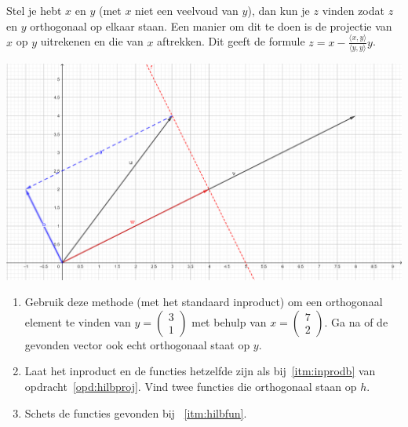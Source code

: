 \documentclass[../../main.tex]{subfiles}
\begin{document}
\begin{opdrachtlang}
Stel je hebt $x$ en $y$ (met $x$ niet een veelvoud van $y$), dan kun je $z$ vinden zodat $z$ en $y$ orthogonaal op elkaar staan. Een manier om dit te doen is de projectie van $x$ op $y$ uitrekenen en die van $x$ aftrekken. Dit geeft de formule $z=x-\frac{\langle x,y\rangle}{\langle y,y\rangle}y$.

\begin{minipage}{\textwidth}
    \includegraphics[width=.95\textwidth]{./img/projectie 2.png}
\end{minipage}
\vspace{.5cm}




\begin{enumerate}
    \item Gebruik deze methode (met het standaard inproduct) om een orthogonaal element te vinden van $y=\begin{pmatrix}3\\1\end{pmatrix}$ met behulp van $x=\begin{pmatrix}7\\2\end{pmatrix}$. Ga na of de gevonden vector ook echt orthogonaal staat op $y$.
\item\label{itm:hilbfun} Laat het inproduct en de functies hetzelfde zijn als bij~\ref{itm:inprodb} van opdracht~\ref{opd:hilbproj}. Vind twee functies die orthogonaal staan op $h$.\\
\item Schets de functies gevonden bij ~\ref{itm:hilbfun}.
\end{enumerate}
\end{opdrachtlang}
\end{document}
